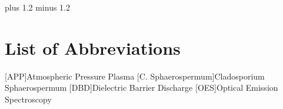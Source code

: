 \documentclass[fontsize=11pt]{scrreprt}
\author{Lorenz Saalmann}
\begin{document}
\font plus 1.2\font
minus 1.2\font



\setcounter{page}{1}



\cleardoublepage

\tableofcontents
\cleardoublepage

\listoffigures
\listoftables
\section*{\huge List of Abbreviations}
\begin{acronym}
  [APP]{\dotfill Atmospheric Pressure Plasma}   
  [C. Sphaerospermum]{\dotfill Cladosporium Sphaerospermum}   
  [DBD]{\dotfill Dielectric Barrier Discharge}
  [OES]{\dotfill Optical Emission Spectroscopy}
\end{acronym}
\cleardoublepage

\onehalfspacing

\cleardoublepage









\cleardoublepage
\renewcommand\bibname{References}
{}
\printbibliography
\cleardoublepage


\fontsize{12pt}{12pt}\selectfont
\clearpage
\end{document}
